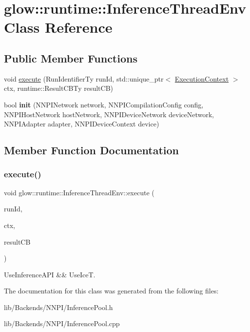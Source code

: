 \hypertarget{classglow_1_1runtime_1_1_inference_thread_env}{}\section{glow\+:\+:runtime\+:\+:Inference\+Thread\+Env Class Reference}
\label{classglow_1_1runtime_1_1_inference_thread_env}
\subsection*{Public Member Functions}
\begin{DoxyCompactItemize}
\item 
void \hyperlink{classglow_1_1runtime_1_1_inference_thread_env_a2d4e81ac266977098e6228090dfc04f0}{execute} (Run\+Identifier\+Ty run\+Id, std\+::unique\+\_\+ptr$<$ \hyperlink{classglow_1_1_execution_context}{Execution\+Context} $>$ ctx, runtime\+::\+Result\+C\+B\+Ty result\+CB)
\item 
\mbox{\label{classglow_1_1runtime_1_1_inference_thread_env_a0cc06fdf8f264bb30d72516619279bd9}} 
bool {\bfseries init} (N\+N\+P\+I\+Network network, N\+N\+P\+I\+Compilation\+Config config, N\+N\+P\+I\+Host\+Network host\+Network, N\+N\+P\+I\+Device\+Network device\+Network, N\+N\+P\+I\+Adapter adapter, N\+N\+P\+I\+Device\+Context device)
\end{DoxyCompactItemize}


\subsection{Member Function Documentation}
\mbox{\label{classglow_1_1runtime_1_1_inference_thread_env_a2d4e81ac266977098e6228090dfc04f0}} 
\subsubsection{\texorpdfstring{execute()}{execute()}}
{\footnotesize\ttfamily void glow\+::runtime\+::\+Inference\+Thread\+Env\+::execute (\begin{DoxyParamCaption}\item[{Run\+Identifier\+Ty}]{run\+Id,  }\item[{std\+::unique\+\_\+ptr$<$ \hyperlink{classglow_1_1_execution_context}{Execution\+Context} $>$}]{ctx,  }\item[{runtime\+::\+Result\+C\+B\+Ty}]{result\+CB }\end{DoxyParamCaption})}

Use\+Inference\+A\+PI \&\& Use\+IceT. 

The documentation for this class was generated from the following files\+:\begin{DoxyCompactItemize}
\item 
lib/\+Backends/\+N\+N\+P\+I/Inference\+Pool.\+h\item 
lib/\+Backends/\+N\+N\+P\+I/Inference\+Pool.\+cpp\end{DoxyCompactItemize}
